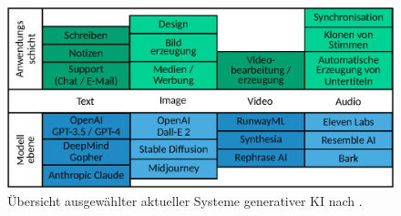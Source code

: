\begin{figure}[htb]
    \centering
    \includegraphics[width=\textwidth]{chapter/chapter_2/generative-ai-landscape.eps}
    \caption{Übersicht ausgewählter aktueller Systeme generativer KI nach \cite{sequoia-genai}.}
    \label{sec2:sota:subsec:fz-explainablity:fig:generative-ai-landscape}
\end{figure}

\FloatBarrier

